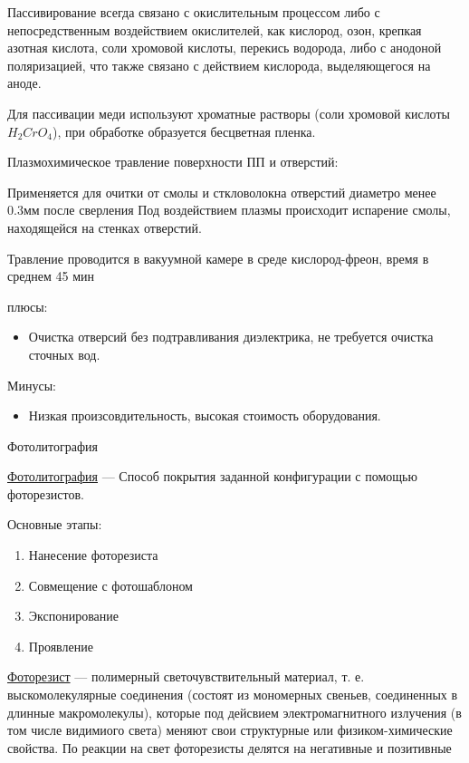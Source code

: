 \documentclass{article}
\begin{document}
Пассивирование всегда связано с окислительным процессом либо с непосредственным воздействием окислителей, как кислород, озон, крепкая азотная кислота, соли хромовой кислоты, перекись водорода, либо с анодоной поляризацией, что также связано с действием кислорода, выделяющегося на аноде.

Для пассивации меди используют хроматные растворы (соли хромовой кислоты $H_2CrO_4$), при обработке образуется бесцветная пленка.

Плазмохимическое травление поверхности ПП и отверстий:

Применяется для очитки от смолы и сткловолокна отверстий диаметро менее 0.3мм после сверления
Под воздействием плазмы происходит испарение смолы, находящейся на стенках отверстий.

Травление проводится в вакуумной камере в среде кислород-фреон, время  в среднем 45 мин

плюсы:
\begin{itemize}
	\item Очистка отверсий без подтравливания диэлектрика, не требуется очистка сточных вод.
\end{itemize}

Минусы:
\begin{itemize}
	\item Низкая произсовдительность, высокая стоимость оборудования.
\end{itemize}

Фотолитография

\underline{Фотолитография} --- Способ покрытия заданной конфигурации с помощью фоторезистов.

Основные этапы:
\begin{enumerate}
	\item Нанесение фоторезиста
	\item Совмещение с фотошаблоном
	\item Экспонирование
	\item Проявление
\end{enumerate}

\underline{Фоторезист}  --- полимерный светочувствительный материал, т. е. выскомолекулярные соединения (состоят из мономерных свеньев, соединенных в длинные макромолекулы), которые под дейсвием электромагнитного излучения (в том числе видимиого света) меняют свои структурные или физиком-химические свойства. По реакции на свет фоторезисты делятся на негативные и позитивные
\end{document}

